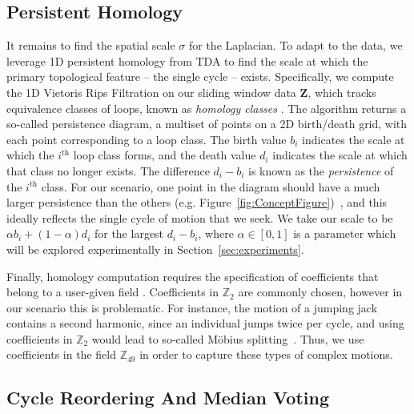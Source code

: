 \documentclass{article}
\newcommand{\mb}{\mathbf}
\begin{document}
\subsection{Persistent Homology}
\label{sec:tda}
It remains to find the spatial scale $\sigma$ for the Laplacian.
To adapt to the data, we leverage 1D persistent homology from TDA \cite{edelsbrunner2010computational} to find the scale at which the primary topological feature -- the single cycle -- exists.  Specifically, we compute the 1D Vietoris Rips Filtration on our sliding window data $\mb{Z}$, which tracks equivalence classes of loops, known as {\em homology classes} \cite{Hatcher}.  The algorithm returns a so-called persistence diagram, a multiset of points on a 2D birth/death grid, with each point corresponding to a loop class.  The birth value $b_i$ indicates the scale at which the $i^{\text{th}}$ loop class forms, and the death value $d_i$ indicates the scale at which that class no longer exists.  The difference $d_i - b_i$ is known as the {\em persistence} of the $i^{\text{th}}$ class.  For our scenario, one point in the diagram should have a much larger persistence than the others (e.g. Figure~\ref{fig:ConceptFigure})~\cite{perea2015sliding,tralie2017quasi}, and this ideally reflects the single cycle of motion that we seek.  We take our scale to be $\alpha b_i + (1-\alpha)d_i$ for the largest $d_i - b_i$, where $\alpha \in [0, 1]$ is a parameter which will be explored experimentally in Section~\ref{sec:experiments}.

Finally, homology computation requires the specification of coefficients that belong to a user-given field \cite{Hatcher,maria2014gudhi}. Coefficients in $\mathbb{Z}_2$ are commonly chosen, however in our scenario this is problematic. For instance, the motion of a jumping jack contains a second harmonic, since an individual jumps twice per cycle, and using coefficients in $\mathbb{Z}_2$ would lead to so-called M{\"o}bius splitting~\cite{traliemoebius, perea2015sliding}. Thus, we use coefficients in the field $\mathbb{Z}_{49}$ in order to capture these types of complex motions.

\subsection{Cycle Reordering And Median Voting}
\label{sec:cyclereordering}
\end{document}
